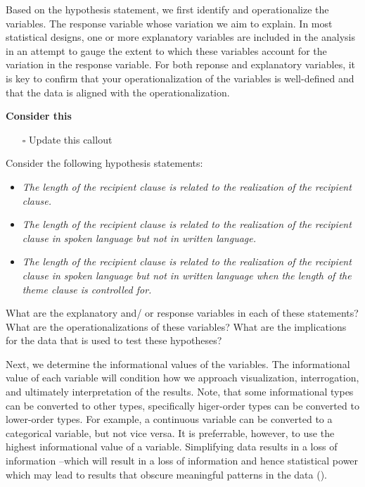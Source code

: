 \documentclass[
  letterpaper,
  DIV=11,
  numbers=noendperiod]{scrreprt}
\providecommand{\tightlist}{%
  \setlength{\itemsep}{0pt}\setlength{\parskip}{0pt}}\usepackage{longtable,booktabs,array}
\theoremstyle{definition}
\theoremstyle{remark}
\begin{document}
Based on the hypothesis statement, we first identify and operationalize
the variables. The response variable whose variation we aim to explain.
In most statistical designs, one or more explanatory variables are
included in the analysis in an attempt to gauge the extent to which
these variables account for the variation in the response variable. For
both reponse and explanatory variables, it is key to confirm that your
operationalization of the variables is well-defined and that the data is
aligned with the operationalization.

\begin{tcolorbox}[enhanced jigsaw, leftrule=.75mm, colframe=quarto-callout-color-frame, colback=white, rightrule=.15mm, opacityback=0, arc=.35mm, breakable, bottomrule=.15mm, left=2mm, toprule=.15mm]

\textbf{ Consider this}

\begin{itemize}
\tightlist
\item[$\square$]
  Update this callout
\end{itemize}

Consider the following hypothesis statements:

\begin{itemize}
\tightlist
\item
  \emph{The length of the recipient clause is related to the realization
  of the recipient clause.}
\item
  \emph{The length of the recipient clause is related to the realization
  of the recipient clause in spoken language but not in written
  language.}
\item
  \emph{The length of the recipient clause is related to the realization
  of the recipient clause in spoken language but not in written language
  when the length of the theme clause is controlled for.}
\end{itemize}

What are the explanatory and/ or response variables in each of these
statements? What are the operationalizations of these variables? What
are the implications for the data that is used to test these hypotheses?

\end{tcolorbox}

Next, we determine the informational values of the variables. The
informational value of each variable will condition how we approach
visualization, interrogation, and ultimately interpretation of the
results. Note, that some informational types can be converted to other
types, specifically higer-order types can be converted to lower-order
types. For example, a continuous variable can be converted to a
categorical variable, but not vice versa. It is preferrable, however, to
use the highest informational value of a variable. Simplifying data
results in a loss of information --which will result in a loss of
information and hence statistical power which may lead to results that
obscure meaningful patterns in the data ().
\end{document}
